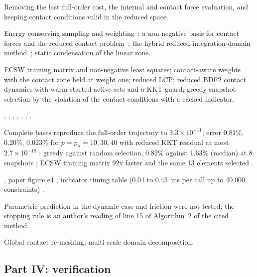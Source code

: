 \begin{description}[style=nextline,leftmargin=1em]
\item[Focus] Removing the last full-order cost, the internal and contact force evaluation, and keeping contact conditions valid in the reduced space.
\item[Mathematics] Energy-conserving sampling and weighting~\cite{farhat2015ecsw}; a non-negative basis for contact forces and the reduced contact problem~\cite{balajewicz2016contact}; the hybrid reduced-integration-domain method~\cite{fauque2018hybrid}; static condensation of the linear zone.
\item[Algorithm] ECSW training matrix and non-negative least squares; contact-aware weights with the contact zone held at weight one; reduced LCP; reduced BDF2 contact dynamics with warm-started active sets and a KKT guard; greedy snapshot selection by the violation of the contact conditions with a cached indicator.
\item[Implementation] , , , , , , .
\item[Verification] Complete bases reproduce the full-order trajectory to $3.3\times10^{-11}$; error 0.81\%, 0.20\%, 0.023\% for $p=p_\lambda=10,30,40$ with reduced KKT residual at most $2.7\times10^{-18}$ \have{}; greedy against random selection, 0.82\% against 1.63\% (median) at 8 snapshots \have{}; ECSW training matrix 92x faster and the same 13 elements selected \have{}.
\item[Figures and tables] , paper figure e4 \have{}; indicator timing table (0.04 to 0.45~ms per call up to 40,000 constraints) \have{}.
\item[Honest limits] Parametric prediction in the dynamic case and friction were not tested; the  stopping rule is an author's reading of line 15 of Algorithm~2 of the cited method.
\item[Exclusions] Global contact re-meshing, multi-scale domain decomposition.
\end{description}

\subsection*{Part IV: verification}

